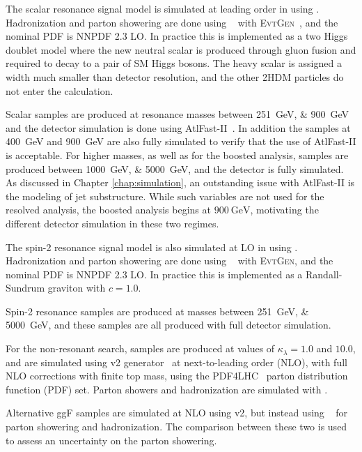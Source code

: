 The scalar resonance signal model is simulated at leading order in \alphas using
\MADGRAPH\cite{MG5}. Hadronization and parton showering are done using
~\cite{Herwig7}\cite{HerwigPP} with \textsc{EvtGen}~\cite{EvtGen},
and the nominal PDF is NNPDF 2.3 LO. In practice this is implemented as a two
Higgs doublet model where the new neutral scalar is produced through gluon
fusion and required to decay to a pair of SM Higgs bosons. The heavy scalar is
assigned a width much smaller than detector resolution, and the other 2HDM
particles do not enter the calculation.

Scalar samples are produced at resonance masses between \SIlist{251;900}{\GeV} and the detector
simulation is done using AtlFast-II~\cite{SOFT-2010-01}. In addition the samples at \SI{400}{\GeV}
and \SI{900}{\GeV} are also fully simulated to verify that the use of AtlFast-II
is acceptable. For higher masses, as well as for the boosted analysis, 
samples are produced between \SIlist{1000;5000}{\GeV}, and the detector is fully simulated.
As discussed in Chapter \ref{chap:simulation}, an outstanding issue with AtlFast-II is the 
modeling of jet substructure. While such variables are not used for the resolved analysis,
the boosted analysis begins at $\SI{900}{\GeV}$, motivating the different detector 
simulation in these two regimes.

The spin-2 resonance signal model is also simulated at LO in \alphas using
\MADGRAPH. Hadronization and parton showering are done using
~\cite{Pythia} with \textsc{EvtGen}, and the nominal PDF is NNPDF 2.3
LO. In practice this is implemented as a Randall-Sundrum graviton with $c=1.0$.

Spin-2 resonance samples are produced at masses between \SIlist{251;5000}{\GeV}, 
and these samples are all produced with full detector simulation.

For the non-resonant search, samples are produced at values of $\kappa_{\lambda} = 1.0$ and $10.0$, and are simulated
using \POWHEGBOX v2 generator~\cite{Powheg1, Powheg2, Powheg3} at next-to-leading order (NLO), with full 
NLO corrections with finite top mass, using the PDF4LHC~\cite{Butterworth:2015oua} parton distribution 
function (PDF) set. Parton showers and hadronization are simulated with .

Alternative ggF samples are simulated at NLO using \POWHEGBOX v2, but instead using ~\cite{Herwigpp} 
for parton showering and hadronization. The comparison between these two is used to assess an uncertainty 
on the parton showering.


